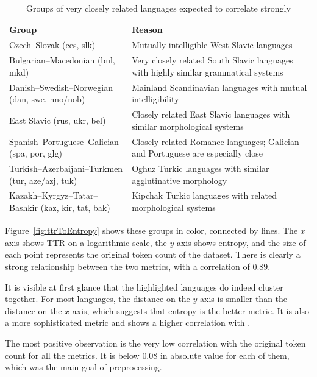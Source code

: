 \begin{table}[p]
\caption{Groups of very closely related languages expected to correlate strongly}
\label{tab:closely_related_languages}
\begin{tabularx}{\textwidth}{
>{\hsize=0.8\hsize\raggedright\arraybackslash}X|
>{\hsize=1.2\hsize\raggedright\arraybackslash}X
}
\textbf{Group} & \textbf{Reason} \\
\hline
\hline
Czech--Slovak (ces, slk) & Mutually intelligible West Slavic languages \\
\hline
Bulgarian--Macedonian (bul, mkd) & Very closely related South Slavic languages with highly similar grammatical systems \\
\hline
Danish--Swedish--Norwegian (dan, swe, nno/nob) & Mainland Scandinavian languages with mutual intelligibility \\
\hline
East Slavic (rus, ukr, bel) & Closely related East Slavic languages with similar morphological systems \\
\hline
Spanish--Portuguese--Galician (spa, por, glg) & Closely related Romance languages; Galician and Portuguese are especially close \\
\hline
Turkish--Azerbaijani--Turkmen (tur, aze/azj, tuk) & Oghuz Turkic languages with similar agglutinative morphology \\
\hline
Kazakh--Kyrgyz--Tatar--Bashkir (kaz, kir, tat, bak) & Kipchak Turkic languages with related morphological systems \\
\hline
\end{tabularx}
\end{table}

Figure~\ref{fig:ttrToEntropy} shows these groups in color, connected by lines. The $x$ axis shows TTR on a logarithmic scale, the $y$ axis shows entropy, and the size of each point represents the original token count of the dataset. There is clearly a strong relationship between the two metrics, with a correlation of $0.89$.

It is visible at first glance that the highlighted languages do indeed cluster together. For most languages, the distance on the $y$ axis is smaller than the distance on the $x$ axis, which suggests that entropy is the better metric. It is also a more sophisticated metric and shows a higher correlation with \textcite{Coltekin2022}.

The most positive observation is the very low correlation with the original token count for all the metrics. It is below $0.08$ in absolute value for each of them, which was the main goal of preprocessing.

